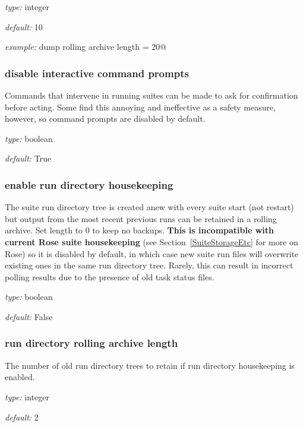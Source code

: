 \begin{myitemize}
\item {\em type:} integer
\item {\em default:} 10
\item {\em example:} \lstinline@state dump rolling archive length = 20@
\end{myitemize}

\subsubsection{disable interactive command prompts}

Commands that intervene in running suites can be made to ask for
confirmation before acting. Some find this annoying and ineffective as a
safety measure, however, so command prompts are disabled by default.

\begin{myitemize}
\item {\em type:} boolean
\item {\em default:} True
\end{myitemize}

\subsubsection{enable run directory housekeeping}

The suite run directory tree is created anew with every suite start
(not restart) but output from the most recent previous runs can be 
retained in a rolling archive. Set length to 0 to keep no backups.
{\bf This is incompatible with current Rose suite housekeeping} (see
Section~\ref{SuiteStorageEtc} for more on Rose) so it is disabled by
default, in which case new suite run files will overwrite existing ones
in the same run directory tree. Rarely, this can result in incorrect
polling results due to the presence of old task status files.

\begin{myitemize}
\item {\em type:} boolean
\item {\em default:} False
\end{myitemize}

\subsubsection{run directory rolling archive length}

The number of old run directory trees to retain if run directory
housekeeping is enabled.
\begin{myitemize}
\item {\em type:} integer
\item {\em default:} 2
\end{myitemize}

